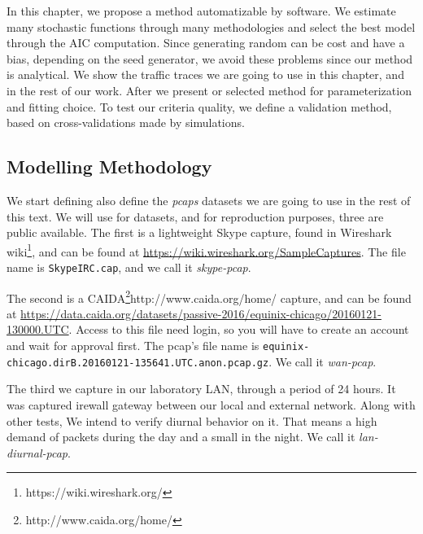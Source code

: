 In this chapter, we propose a method automatizable by  software. We estimate many stochastic functions through many methodologies and select the best model through the AIC computation\cite{bic-aic-comparision}. Since generating random can be cost and have a bias, depending on the seed generator, we avoid these problems since our method is analytical. We show the traffic traces we are going to use in this chapter, and in the rest of our work. After we present or selected method for parameterization and fitting choice. To test our criteria quality, we define a validation method, based on cross-validations made by simulations.


 

\subsection{Modelling Methodology}

We start defining also define the \textit{pcaps} datasets we are going to use in the rest of this text. We will use for datasets, and for reproduction purposes, three are public available. 
The first is a lightweight Skype capture, found in  Wireshark wiki\footnote{https://wiki.wireshark.org/}, and can be found at \href{https://wiki.wireshark.org/SampleCaptures}{https://wiki.wireshark.org/SampleCaptures}. The file name is \texttt{SkypeIRC.cap}, and we call it \textit{skype-pcap}.

The second is a CAIDA\footnote{http://www.caida.org/home/}{http://www.caida.org/home/} capture, and can be found at  \href{https://data.caida.org/datasets/passive-2016/equinix-chicago/20160121-130000.UTC}{https://data.caida.org/datasets/passive-2016/equinix-chicago/20160121-130000.UTC}. Access to this file need login, so you will have to create an account and wait for approval first. The pcap's file name is \texttt{equinix-chicago.dirB.20160121-135641.UTC.anon.pcap.gz}. We call it \textit{wan-pcap}.

The third we capture in our laboratory LAN, through a period of 24 hours. It was captured irewall gateway between our local and external network. Along with other tests, We intend to verify diurnal behavior on it. That means a high demand of packets during the day and a small in the night. We call it \textit{lan-diurnal-pcap}.

